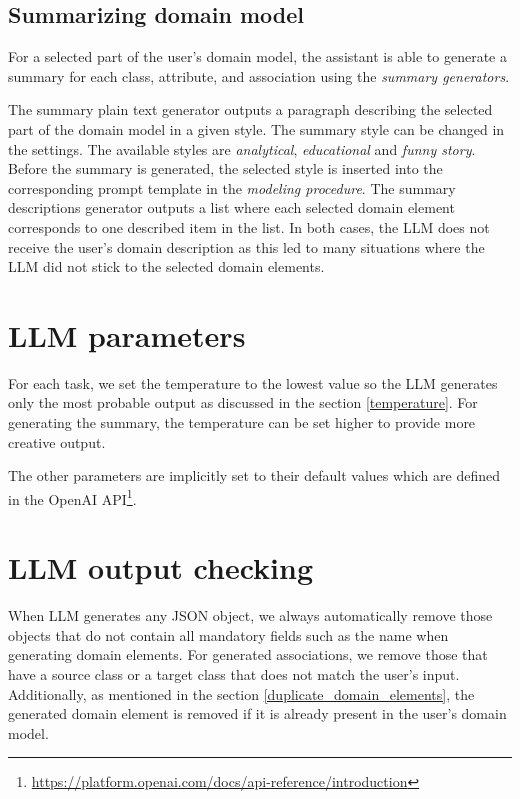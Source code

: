 \subsection{Summarizing domain model}
\label{sec:summarising_domain_model}

For a selected part of the user's domain model, the assistant is able to generate a summary for each class, attribute, and association using the \emph{summary generators}.

The summary plain text generator outputs a paragraph describing the selected part of the domain model in a given style. The summary style can be changed in the settings. The available styles are \textit{analytical}, \textit{educational} and \textit{funny story}. Before the summary is generated, the selected style is inserted into the corresponding prompt template in the \emph{modeling procedure}. The summary descriptions generator outputs a list where each selected domain element corresponds to one described item in the list. In both cases, the LLM does not receive the user's domain description as this led to many situations where the LLM did not stick to the selected domain elements.


\section{LLM parameters}

For each task, we set the temperature to the lowest value so the LLM generates only the most probable output as discussed in the section \ref{temperature}. For generating the summary, the temperature can be set higher to provide more creative output.

The other parameters are implicitly set to their default values which are defined in the OpenAI API\footnote{\url{https://platform.openai.com/docs/api-reference/introduction}}.


\section{LLM output checking}

When LLM generates any JSON object, we always automatically remove those objects that do not contain all mandatory fields such as the name when generating domain elements. For generated associations, we remove those that have a source class or a target class that does not match the user's input. Additionally, as mentioned in the section \ref{duplicate_domain_elements}, the generated domain element is removed if it is already present in the user's domain model.

